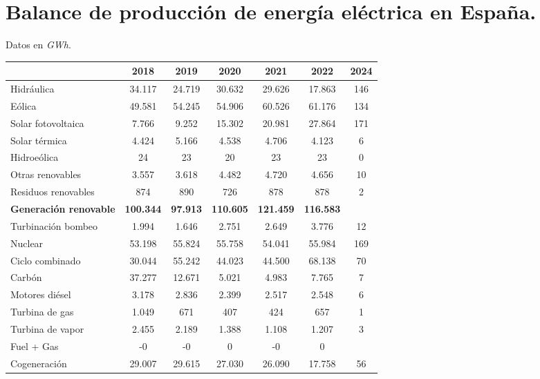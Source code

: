 \section{Balance de producción de energía eléctrica en España.}
	Datos en \textit{GWh}.
	\begin{table}[H]
		\renewcommand{\arraystretch}{1.2}
		\centering
		\begin{tabular}{l|cccccc}
			& 2018 & 2019 & 2020 & 2021 & 2022 & 2024\\
			\hline
			Hidráulica            & 34.117  & 24.719 & 30.632  & 29.626  &  17.863 & 146\\
			Eólica                & 49.581  & 54.245 & 54.906  & 60.526  &  61.176 & 134\\
			Solar fotovoltaica    &  7.766  &  9.252 & 15.302  & 20.981  &  27.864 & 171\\
			Solar térmica         &  4.424  &  5.166 &  4.538  &  4.706  &   4.123 & 6\\
			Hidroeólica           & 24      & 23     & 20      & 23      &  23     & 0\\
			Otras renovables      &  3.557  &  3.618 &  4.482  &  4.720  &   4.656 & 10\\
			Residuos renovables   &  874    &  890   &  726    &  878    &   878   & 2\\
			\textbf{Generación renovable}  & \textbf{100.344} & \textbf{97.913} & \textbf{110.605} & \textbf{121.459} & \textbf{116.583} & \\
			Turbinación bombeo    &   1.994 &  1.646 &   2.751 &   2.649 &   3.776 & 12\\
			Nuclear               &  53.198 & 55.824 &  55.758 &  54.041 &  55.984 & 169\\
			Ciclo combinado       &  30.044 & 55.242 &  44.023 &  44.500 &  68.138 & 70\\
			Carbón                &  37.277 & 12.671 &   5.021 &   4.983 &   7.765 & 7\\
			Motores diésel        &   3.178 &  2.836 &   2.399 &   2.517 &   2.548 & 6\\
			Turbina de gas        &   1.049 &  671   &   407   &   424   &   657   & 1\\
			Turbina de vapor      &   2.455 &  2.189 &   1.388 &   1.108 &   1.207 & 3\\
			Fuel + Gas            &  -0     & -0     &   0     &  -0     &   0     & \\
			Cogeneración          &  29.007 & 29.615 &  27.030 &  26.090 &  17.758 & 56\\

\end{tabular}
\end{table}
